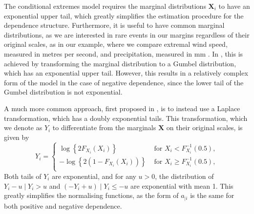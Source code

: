 \documentclass{article}
\numberwithin{equation}{section}
\begin{document}
The conditional extremes model requires the marginal distributions $\bm{X}_i$ to have an exponential upper tail, which greatly simplifies the estimation procedure for the dependence structure.
Furthermore, it is useful to have common marginal distributions, as we are interested in rare events in our margins regardless of their original scales, as in our example, where we compare extremal wind speed, measured in metres per second, and precipitation, measured in mm \cite{Winter2016}.
In \cite{Heffernan2004}, this is achieved by transforming the marginal distribution to a Gumbel distribution, which has an exponential upper tail.
However, this results in a relatively complex form of the model in the case of negative dependence, since the lower tail of the Gumbel distribution is not exponential.

A much more common approach, first proposed in \cite{Keef2013}, is to instead use a Laplace transformation, which has a doubly exponential tails.
This transformation, which we denote as $Y_i$ to differentiate from the marginals $\bm{X}$ on their original scales, is given by 
\begin{equation} \label{eq:laplace}
  Y_i = \begin{cases}
    \log\left\{2F_{X_i}(X_i)\right\} &\text{ for } X_i < F_{X_i}^{-1}(0.5), \\
    -\log\left\{2(1 - F_{X_i}(X_i))\right\} &\text{ for } X_i \ge F_{X_i}^{-1}(0.5), \\
  \end{cases}
\end{equation}
Both tails of $Y_i$ are exponential, and for any $u > 0$, the distribution of $Y_i - u \mid Y_i > u$ and $(-Y_i + u) \mid Y_i \le -u$ are exponential with mean 1. 
This greatly simplifies the normalising functions, as the form of $a_{\mid i}$ is the same for both positive and negative dependence. 
\end{document}
